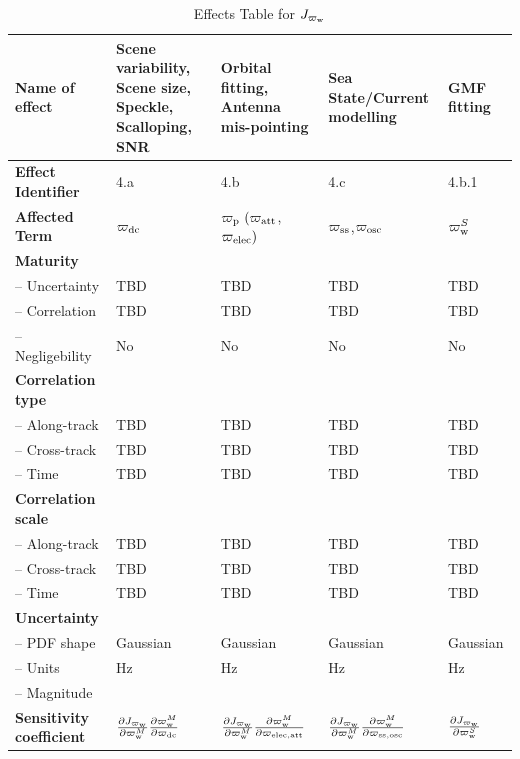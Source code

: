 \begin{table}[h]
		\centering
		\scriptsize %
		\setlength{\tabcolsep}{2pt} %
		\caption{Effects Table for $J_{\varpi_{\rm w}}$}
		
		\begin{tabularx}{\textwidth}{l | X | X | X | X}
			\toprule
			\textbf{Name of effect} & Scene variability, Scene size, Speckle, Scalloping, SNR & Orbital fitting, Antenna mis-pointing & Sea State/Current modelling & GMF fitting \\
			\midrule
			\textbf{Effect Identifier} & 4.a & 4.b & 4.c & 4.b.1 \\
			\midrule
			\textbf{Affected Term} & $\varpi_{\rm dc}$ & $\varpi_{\rm p} \ (\varpi_{\rm att}$,$\varpi_{\rm elec})$ & $\varpi_{\rm ss}$,$\varpi_{\rm osc}$ & $\varpi_{\rm w}^{S}$ \\
			\midrule
			\textbf{Maturity} &  &  &  &  \\
			\quad -- Uncertainty & TBD & TBD & TBD & TBD \\
			\quad -- Correlation & TBD & TBD & TBD & TBD \\
			\quad -- Negligebility & No & No & No & No \\
			\midrule
			\textbf{Correlation type} &  &  &  &  \\
			\quad -- Along-track & TBD & TBD & TBD & TBD \\
			\quad -- Cross-track & TBD & TBD & TBD & TBD \\
			\quad -- Time & TBD & TBD & TBD & TBD \\
			\midrule
			\textbf{Correlation scale} &  &  &  &  \\
			\quad -- Along-track & TBD & TBD & TBD & TBD \\
			\quad -- Cross-track & TBD & TBD & TBD & TBD \\
			\quad -- Time & TBD & TBD & TBD & TBD \\
			\midrule
			\textbf{Uncertainty} & & & & \\
			\quad -- PDF shape & Gaussian & Gaussian & Gaussian & Gaussian \\
			\quad -- Units & Hz & Hz & Hz & Hz \\
			\quad -- Magnitude & & & & \\
			\midrule
			\textbf{Sensitivity coefficient} & $\frac{\partial J_{\varpi_{\rm w}}}{\partial \varpi_{\rm w}^{M}} \frac{\partial \varpi_{\rm w}^{M}}{\partial \varpi_{\rm dc}}$ & $\frac{\partial J_{\varpi_{\rm w}}}{\partial \varpi_{\rm w}^{M}} \frac{\partial \varpi_{\rm w}^{M}}{\partial \varpi_{\rm elec,att}}$ & $\frac{\partial J_{\varpi_{\rm w}}}{\partial \varpi_{\rm w}^{M}} \frac{\partial \varpi_{\rm w}^{M}}{\partial \varpi_{\rm ss,osc}}$ & $\frac{\partial J_{\varpi_{\rm w}}}{\partial \varpi_{\rm w}^{S}}$ \\
			\bottomrule
		\end{tabularx}
        \label{tab: effects Jfw}
	\end{table}


